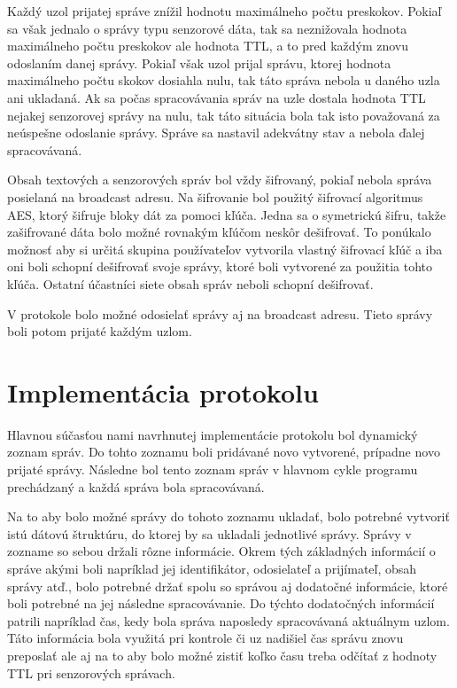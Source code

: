 \documentclass[slovak,master]{diploma}
\begin{document}
Každý uzol prijatej správe znížil hodnotu maximálneho počtu preskokov. Pokiaľ sa však jednalo o správy typu senzorové dáta, tak sa neznižovala hodnota maximálneho počtu preskokov 
ale hodnota TTL, a to pred každým znovu odoslaním danej správy. Pokiaľ však uzol prijal správu, ktorej hodnota maximálneho počtu skokov dosiahla nulu, tak táto 
správa nebola u daného uzla ani ukladaná. Ak sa počas spracovávania správ na uzle dostala hodnota TTL nejakej senzorovej správy na nulu, tak táto situácia bola tak isto považovaná 
za neúspešne odoslanie správy. Správe sa nastavil adekvátny stav a nebola ďalej spracovávaná.

Obsah textových a senzorových správ bol vždy šifrovaný, pokiaľ nebola správa posielaná na broadcast adresu. Na šifrovanie bol použitý šifrovací algoritmus AES, ktorý šifruje bloky dát za pomoci kľúča.
Jedna sa o symetrickú šifru, takže zašifrované dáta bolo možné rovnakým kľúčom neskôr dešifrovať. To ponúkalo možnosť aby si určitá skupina používateľov vytvorila vlastný 
šifrovací kľúč a iba oni boli schopní dešifrovať svoje správy, ktoré boli vytvorené za použitia tohto kľúča. Ostatní účastníci siete obsah správ neboli schopní dešifrovať.

V protokole bolo možné odosielať správy aj na broadcast adresu. Tieto správy boli potom prijaté každým uzlom.

\section{Implementácia protokolu}
Hlavnou súčasťou nami navrhnutej implementácie protokolu bol dynamický zoznam správ. Do tohto zoznamu boli pridávané novo vytvorené, 
prípadne novo prijaté správy. Následne bol tento zoznam správ v hlavnom cykle programu prechádzaný a každá správa bola spracovávaná.

Na to aby bolo možné správy do tohoto zoznamu ukladať, bolo potrebné vytvoriť istú dátovú štruktúru, do ktorej by sa ukladali jednotlivé správy.
Správy v zozname so sebou držali rôzne informácie. Okrem tých základných informácií o správe akými boli napríklad jej identifikátor, odosielateľ a prijímateľ, obsah správy atď., 
bolo potrebné držať spolu so správou aj dodatočné informácie, ktoré boli potrebné na jej následne spracovávanie. Do týchto dodatočných informácií patrili napríklad 
čas, kedy bola správa naposledy spracovávaná aktuálnym uzlom. Táto informácia bola využitá pri kontrole či uz nadišiel čas správu znovu preposlať ale aj 
na to aby bolo možné zistiť koľko času treba odčítať z hodnoty TTL pri senzorových správach.
\end{document}
